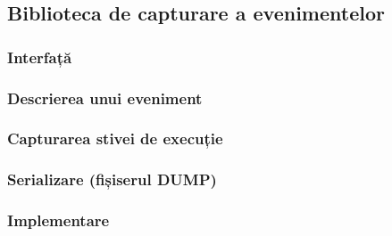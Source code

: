 \subsection{Biblioteca de capturare a evenimentelor}
\subsubsection{Interfață}
\subsubsection{Descrierea unui eveniment}
\subsubsection{Capturarea stivei de execuție}
\subsubsection{Serializare (fișiserul DUMP)}
\subsubsection{Implementare}
